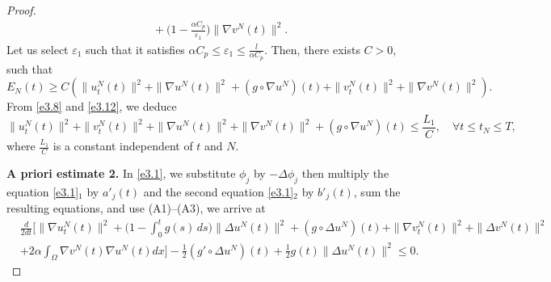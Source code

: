 \documentclass[reqno]{amsart}
\begin{document}
\begin{proof}
\begin{equation}
\begin{aligned}
 &\quad +\Big( 1-\frac{\alpha C_p}{\varepsilon_{1}}\Big) \| \nabla v^N(t) \|^2.
\end{aligned}\label{e3.13}
\end{equation}
Let us select $\varepsilon_{1}$ such that it satisfies
$\alpha C_p \leq \varepsilon_{1}\leq \frac{l}{\alpha C_p}$.
Then, there exists $C>0$, such that
\begin{equation}
E_N(t)\geq C\left( \| u^N_{t}(t) \|^2 + \| \nabla u^N (t)\|^2
+(g\circ\nabla u^N)(t)+\| v^N_{t}(t) \|^2 + \| \nabla v^N (t)\|^2\right).\label{e3.14}
\end{equation}
From \eqref{e3.8} and \eqref{e3.12}, we deduce
\begin{equation}
\| u^N_{t}(t) \|^2 +\| v^N_{t}(t) \|^2 + \| \nabla u^N(t) \|^2
+ \| \nabla v^N (t)\|^2 +(g\circ\nabla u^N)(t)\leq \frac{L_{1}}{C},\quad
\forall t\leq t_{N}\leq T,
\label{e3.15}
\end{equation}
where $\frac{L_{1}}{C}$ is a constant independent of $t$ and $N$.
\smallskip

\noindent\textbf{A priori estimate 2.}
In \eqref{e3.1}, we substitute $\phi_j $ by $ -\Delta \phi_j$ then
multiply the equation \eqref{e3.1}$_1$ by $a'_j(t)$ and the second equation
\eqref{e3.1}$_2$ by $b'_j(t)$, sum the resulting equations, and use
(A1)--(A3), we arrive at
\begin{align*}
&\frac{d}{2dt}\Big[ \| \nabla u^N_{t}(t) \|^2
+\Big( 1 - \int_0^t g(s)\,ds \Big) \| \Delta u^N(t) \|^2
+ (g \circ \Delta u^N)(t) + \| \nabla v^N_{t}(t) \|^2
+ \| \Delta v^N(t) \|^2 \\
& +2 \alpha \int_{\Omega} \nabla v^N(t) \nabla u^N(t) dx\Big]
-\frac{1}{2} \left( g' \circ \Delta u^N \right)(t)
+\frac{1}{2} g(t) \| \Delta u^N(t) \|^2\leq 0.
\end{align*}


\end{proof}
\end{document}
